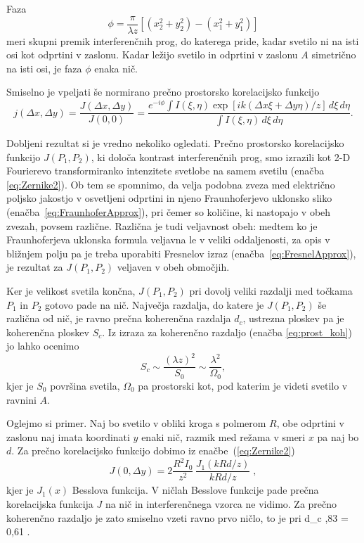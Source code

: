 Faza 
\begin{equation}
\phi=\frac{\pi}{\lambda z}[(x_{2}^{2}+y_{2}^{2})-(x_{1}^{2}+y_{1}^{2})]
\end{equation}
meri skupni premik interferenčnih prog, do katerega pride, kadar svetilo
ni na isti osi kot odprtini v zaslonu. Kadar ležijo svetilo in odprtini
v zaslonu $A$ simetrično na isti osi, je faza $\phi$ enaka nič.

Smiselno je vpeljati še normirano prečno prostorsko korelacijsko
funkcijo 
\begin{equation}
j(\Delta x,\Delta y)=\frac{J(\Delta x,\Delta y)}{J(0,0)}=\frac{e^{-i\phi}\int 
I(\xi,\eta)\exp\left[ik(\Delta x\xi+\Delta y\eta)/z\right]\, d\xi\, d\eta}
{\int I(\xi,\eta)\, d\xi\, d\eta}.
\label{eq:Zernike2-norm}
\end{equation}

Dobljeni rezultat si je vredno nekoliko ogledati. Prečno prostorsko
korelacijsko funkcijo $J(P_{1},P_{2})$, ki določa kontrast interferenčnih
prog, smo izrazili kot 2-D  Fourierevo transformiranko intenzitete svetlobe
na samem svetilu (enačba \ref{eq:Zernike2}). Ob tem se spomnimo,
da velja podobna zveza med električno poljsko jakostjo v osvetljeni odprtini 
in njeno Fraunhoferjevo uklonsko sliko (enačba~\ref{eq:FraunhoferApprox}), 
pri čemer so količine, ki nastopajo v obeh zvezah,
povsem različne. Različna je tudi veljavnost obeh: medtem ko je Fraunhoferjeva
uklonska formula veljavna le v veliki oddaljenosti, za opis v bližnjem polju
pa je treba uporabiti Fresnelov izraz (enačba~\ref{eq:FresnelApprox}), 
je rezultat za $J(P_{1},P_{2})$ veljaven v obeh območjih.

Ker je velikost svetila končna, $J(P_{1},P_{2})$ pri dovolj veliki
razdalji med točkama $P_{1}$ in $P_{2}$ gotovo pade na nič. Največja
razdalja, do katere je $J(P_{1},P_{2})$ še različna od nič, je ravno
prečna koherenčna razdalja $d_{c}$, ustrezna ploskev pa je koherenčna
ploskev $S_{c}$. Iz izraza za koherenčno razdaljo 
(enačba \ref{eq:prost_koh}) jo lahko ocenimo
\begin{equation}
S_{c}\sim\frac{(\lambda z)^{2}}{S_{0}}\sim\frac{\lambda^{2}}{\Omega_{0}},
\label{eq:koherencna-ploskev}
\end{equation}
kjer je $S_{0}$ površina svetila, $\Omega_{0}$ pa prostorski kot,
pod katerim je videti svetilo v ravnini $A$. 

Oglejmo si primer. Naj bo svetilo v obliki kroga 
s polmerom $R$, obe odprtini v zaslonu naj imata koordinati $y$  enaki nič, razmik
med režama v smeri $x$ pa naj bo $d$. 
Za prečno korelacijsko funkcijo dobimo iz enačbe~(\ref{eq:Zernike2})
\begin{equation}
J(0,\Delta y)=2\frac{R^{2}I_{0}}{z^{2}}\,\frac{J_{1}(kRd/z)}{kRd/z}\;,
\end{equation}kjer je $J_{1}(x)$ Besslova funkcija. V ničlah Besslove funkcije
pade prečna korelacijska funkcija $J$ na nič in interferenčnega vzorca ne vidimo. 
Za prečno koherenčno razdaljo je zato smiselno vzeti ravno prvo ničlo, to
je pri
\beq
\label{eq:okroglo_svetilo}
d_{c} ,83  = 0,61 .
\eeq


